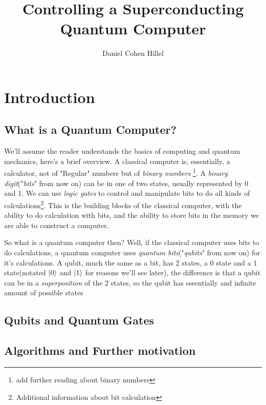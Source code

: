 \documentclass{article}
\title{Controlling a Superconducting Quantum Computer}
\author{Daniel Cohen Hillel}
\date{}
\numberwithin{equation}{section}
\begin{document}
\maketitle

\newpage

\tableofcontents

\newpage

\section{Introduction}

\subsection{What is a Quantum Computer?}
We'll assume the reader understands the basics of computing and quantum mechanics, here's a brief overview. \newline
 A classical computer is, essentially, a calculator, not of "Regular" numbers but of \textit{binary numbers} \footnote{ add further reading about binary numbers}. A \textit{binary digit}("\textit{bits}" from now on) can be in one of two states, usually represented by 0 and 1. We can use \textit{logic gates} to control and manipulate bits to do all kinds of calculations\footnote{Additional information about bit calculation}. This is the building blocks of the classical computer, with the ability to do calculation with bits, and the ability to store bits in the memory we are able to construct a computer.\newline \par
So what is a quantum computer then? Well, if the classical computer uses bits to do calculations, a quantum computer uses \textit{quantum bits}("\textit{qubits}" from now on) for it's calculations. A qubit, much the same as a bit, has 2 states, a 0 state and a 1 state(notated $\ket{0}$ and $\ket{1}$ for reasons we'll see later), the difference is that a qubit can be in a \textit{superposition} of the 2 states, so the qubit has essentially and infinite amount of possible states

\subsection{Qubits and Quantum Gates}

\subsection{Algorithms and Further motivation}
\end{document}
